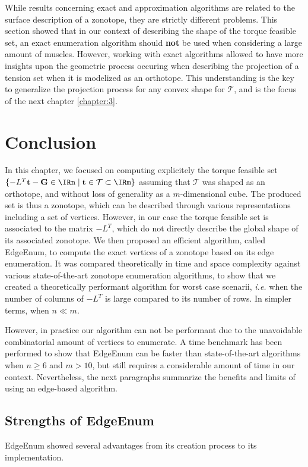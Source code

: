 While results concerning exact and approximation algorithms are related to the surface description of a zonotope, they are strictly different problems. This section showed that in our context of describing the shape of the torque feasible set, an exact enumeration algorithm should \textbf{not} be used when considering a large amount of muscles. However, working with exact algorithms allowed to have more insights upon the geometric process occuring when describing the projection of a  tension set when it is modelized as an orthotope. This understanding is the key to generalize the projection process for any convex shape for $\mathcal{T}$, and is the focus of the next chapter \ref{chapter:3}.

\section{Conclusion}
\label{conclusion_zonotope_enum_algorithm}
In this chapter, we focused on computing explicitely the torque feasible set $\{ -L^T\mathbf{t} - \mathbf{G}\in \IRn \mid \mathbf{t}\in\mathcal{T}\subset \IRm \}$ assuming that $\mathcal{T}$ was shaped as an orthotope, and without loss of generality as a $m$-dimensional cube. The produced set is thus a zonotope, which can be described through various representations including a set of  vertices. However, in our case the torque feasible set is associated to the matrix $-L^T$, which do not directly describe the global shape of its associated zonotope. We then proposed an efficient algorithm, called EdgeEnum, to compute the exact vertices of a zonotope based on its edge enumeration. It was compared theoretically in time and space complexity against various state-of-the-art zonotope enumeration algorithms, to show that we created a theoretically performant algorithm for worst case scenarii, \emph{i.e.} when the number of columns of $-L^T$ is large compared to its number of rows. In simpler terms, when $n\ll m$. 

However, in practice our algorithm can not be performant due to the unavoidable combinatorial amount of vertices to enumerate. A time benchmark has been performed to show that EdgeEnum can be faster than state-of-the-art algorithms when $n\geq 6$ and $m> 10$, but still requires a considerable amount of time in our context. Nevertheless, the next paragraphs summarize the benefits and limits of using an edge-based algorithm.

\subsection{Strengths of EdgeEnum}
EdgeEnum showed several advantages from its creation process to its implementation.

